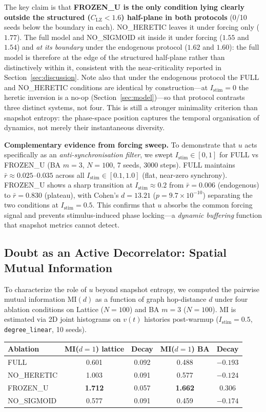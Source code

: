 ﻿\documentclass[11pt]{article}
\begin{document}
The key claim is that \textbf{FROZEN\_U is the only condition lying clearly outside the structured ($C_{\text{LZ}} < 1.6$) half-plane in both protocols} (0/10 seeds below the boundary in each). NO\_HERETIC leaves it under forcing only ($1.77$). The full model and NO\_SIGMOID sit inside it under forcing ($1.55$ and $1.54$) and \emph{at its boundary} under the endogenous protocol ($1.62$ and $1.60$): the full model is therefore at the edge of the structured half-plane rather than distinctively within it, consistent with the near-criticality reported in Section~\ref{sec:discussion}. Note also that under the endogenous protocol the FULL and NO\_HERETIC conditions are identical by construction---at $I_{\text{stim}} = 0$ the heretic inversion is a no-op (Section~\ref{sec:model})---so that protocol contrasts three distinct systems, not four. This is still a stronger minimality criterion than snapshot entropy: the phase-space position captures the temporal organisation of dynamics, not merely their instantaneous diversity.

\textbf{Complementary evidence from forcing sweep.} To demonstrate that $u$ acts specifically as an \emph{anti-synchronisation filter}, we swept $I_{\text{stim}} \in [0, 1]$ for FULL vs FROZEN\_U (BA $m=3$, $N=100$, 7 seeds, 3000 steps). FULL maintains $\bar{r} \approx 0.025$--$0.035$ across all $I_{\text{stim}} \in [0.1, 1.0]$ (flat, near-zero synchrony). FROZEN\_U shows a sharp transition at $I_{\text{stim}} \approx 0.2$ from $\bar{r} = 0.006$ (endogenous) to $\bar{r} = 0.830$ (plateau), with Cohen's $d = 13.21$ ($p = 9.7 \times 10^{-10}$) separating the two conditions at $I_{\text{stim}} = 0.5$. This confirms that $u$ absorbs the common forcing signal and prevents stimulus-induced phase locking---a \emph{dynamic buffering} function that snapshot metrics cannot detect.

\subsection{Doubt as an Active Decorrelator: Spatial Mutual Information}
\label{sec:mi_analysis}

To characterize the role of $u$ beyond snapshot entropy, we computed the pairwise mutual information MI$(d)$ as a function of graph hop-distance $d$ under four ablation conditions on Lattice ($N=100$) and BA $m=3$ ($N=100$). MI is estimated via 2D joint histograms on $v(t)$ histories post-warmup ($I_{\mathrm{stim}}=0.5$, \texttt{degree\_linear}, 10 seeds).

\begin{center}
\begin{tabular}{lcccc}
\toprule
Ablation & MI($d=1$) lattice & Decay & MI($d=1$) BA & Decay \\
\midrule
FULL       & 0.601 & 0.092 & 0.488 & $-0.193$ \\
NO\_HERETIC & 1.003 & 0.091 & 0.577 & $-0.124$ \\
FROZEN\_U  & \textbf{1.712} & 0.057 & \textbf{1.662} & 0.306 \\
NO\_SIGMOID & 0.577 & 0.091 & 0.459 & $-0.174$ \\
\bottomrule
\end{tabular}
\end{center}
\end{document}
